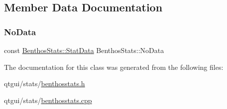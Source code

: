 \subsection{Member Data Documentation}
\mbox{\label{class_benthos_stats_a8720f61b965c406a6620aa1b62a8e4c8}} 
\subsubsection{\texorpdfstring{NoData}{NoData}}
{\footnotesize\ttfamily const \mbox{\hyperlink{struct_benthos_stats_1_1_stat_data}{Benthos\+Stats\+::\+Stat\+Data}} Benthos\+Stats\+::\+No\+Data\hspace{0.3cm}{\ttfamily [static]}}



The documentation for this class was generated from the following files\+:\begin{DoxyCompactItemize}
\item 
qtgui/stats/\mbox{\hyperlink{benthosstats_8h}{benthosstats.\+h}}\item 
qtgui/stats/\mbox{\hyperlink{benthosstats_8cpp}{benthosstats.\+cpp}}\end{DoxyCompactItemize}

